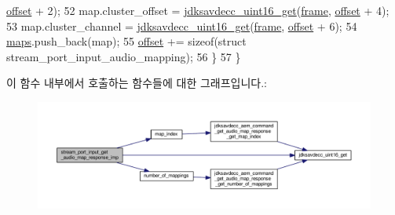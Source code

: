 \begin{DoxyCode}
      \hyperlink{classavdecc__lib_1_1stream__port__input__get__audio__map__response__imp_aadb6d6eb83e646653a1402032e45dcab}{offset} + 2);
52         map.cluster\_offset = \hyperlink{group__endian_ga3fbbbc20be954aa61e039872965b0dc9}{jdksavdecc\_uint16\_get}(\hyperlink{gst__avb__playbin_8c_ac8e710e0b5e994c0545d75d69868c6f0}{frame}, 
      \hyperlink{classavdecc__lib_1_1stream__port__input__get__audio__map__response__imp_aadb6d6eb83e646653a1402032e45dcab}{offset} + 4);
53         map.cluster\_channel = \hyperlink{group__endian_ga3fbbbc20be954aa61e039872965b0dc9}{jdksavdecc\_uint16\_get}(\hyperlink{gst__avb__playbin_8c_ac8e710e0b5e994c0545d75d69868c6f0}{frame}, 
      \hyperlink{classavdecc__lib_1_1stream__port__input__get__audio__map__response__imp_aadb6d6eb83e646653a1402032e45dcab}{offset} + 6);
54         \hyperlink{classavdecc__lib_1_1stream__port__input__get__audio__map__response__imp_a08742edfc36f8b426cf39d4f7e89275a}{maps}.push\_back(map);
55         \hyperlink{classavdecc__lib_1_1stream__port__input__get__audio__map__response__imp_aadb6d6eb83e646653a1402032e45dcab}{offset} += \textcolor{keyword}{sizeof}(\textcolor{keyword}{struct }stream\_port\_input\_audio\_mapping);
56     \}
57 \}
\end{DoxyCode}


이 함수 내부에서 호출하는 함수들에 대한 그래프입니다.\+:
\nopagebreak
\begin{figure}[H]
\begin{center}
\leavevmode
\includegraphics[width=350pt]{classavdecc__lib_1_1stream__port__input__get__audio__map__response__imp_a97a338786c844fca5efb66258115b0f4_cgraph}
\end{center}
\end{figure}


